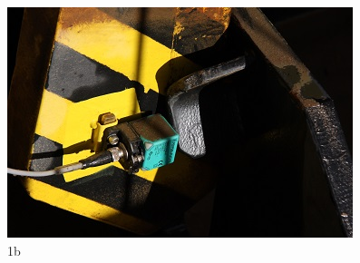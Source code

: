 \begin{figure}[h!]
  \centering
  \includegraphics[width=1\linewidth]{Fotos/Janeiro2015/18.jpg}
  \caption{1b}
  \label{nov20136}
\end{figure}

